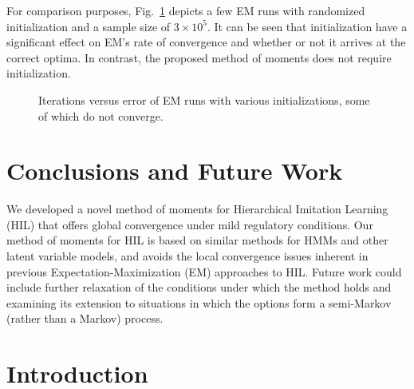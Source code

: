For comparison purposes, Fig.\ \ref{fig:EM_error} depicts a few EM runs with randomized initialization and a sample size of $3 \times 10^5$. It can be seen that initialization have a significant effect on EM's rate of convergence and whether or not it arrives at the correct optima. In contrast, the proposed method of moments does not require initialization.
\begin{figure}
    \centering
    \caption{Iterations versus error of EM runs with various initializations, some of which do not converge.}
    \label{fig:EM_error}
\end{figure}

\section{Conclusions and Future Work}
\label{sec:conclusions}
We developed a novel method of moments for Hierarchical Imitation Learning (HIL) that offers global convergence under mild regulatory conditions.
Our method of moments for HIL is based on similar methods for HMMs and other latent variable models, and avoids the local convergence issues inherent in previous Expectation-Maximization (EM) approaches to HIL.
Future work could include further relaxation of the conditions under which the method holds and examining its extension to situations in which the options form a semi-Markov (rather than a Markov) process.

\section{Introduction}
\label{sec:intro}

